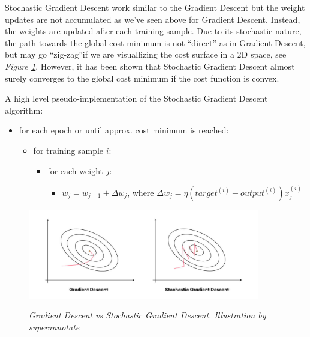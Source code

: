 Stochastic Gradient Descent work similar to the Gradient Descent but the weight
updates are not accumulated as we’ve seen above for Gradient Descent. Instead,
the weights are updated after each training sample. Due to its stochastic
nature, the path towards the global cost minimum is not “direct” as in Gradient
Descent, but may go “zig-zag”if we are visuallizing the cost surface in a 2D
space, see \textit{Figure \ref{fig:sgdvsgd}}. However, it has been shown that
Stochastic Gradient Descent almost surely converges to the global cost minimum
if the cost function is convex. \newline

A high level pseudo-implementation of the Stochastic Gradient Descent
algorithm:

\begin{itemize}[label=$\circ$]
  \item for each epoch or until approx. cost minimum is reached:
    \begin{itemize}[label=$\circ$, topsep=0pt]
      \item for training sample \(i\):
        \begin{itemize}[label=$\circ$, topsep=5pt]
          \item for each weight \(j\):
            \begin{itemize}[label=$\circ$, topsep=10pt]
              \item \(w_j = w_{j-1} + \Delta w_j\), where \(\Delta w_j = \eta (target^{(i)} - output^{(i)})x_{j}^{(i)}\)
            \end{itemize}
        \end{itemize}
    \end{itemize}
\end{itemize}

\begin{figure}[H]
  \centering
  \begin{adjustbox}{trim=0cm 0cm 0cm 1cm, clip}
    \includegraphics[width=0.9\textwidth]{imatges/preliminaries/sgdvsgd.jpeg}
  \end{adjustbox}
  \caption[Gradient Descent vs Stochastic Gradient Descent]{\textit{Gradient Descent vs Stochastic Gradient Descent. Illustration by superannotate}}
  {\label{fig:sgdvsgd}}
\end{figure}

